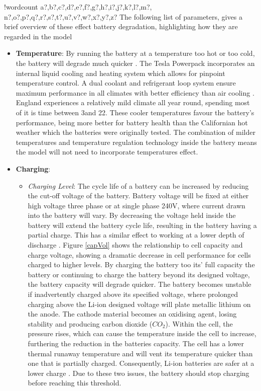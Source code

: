\documentclass[fontsize=9.5pt]{extarticle}
\numberwithin{figure}{section} %
\providecommand{\tightlist}{%
  \setlength{\itemsep}{0pt}\setlength{\parskip}{0pt}}
\newcounter{words}
\newenvironment{counted}{%
  \setcounter{words}{0}
  \SearchList!{wordcount}{\stepcounter{words}}
    {a?,b?,c?,d?,e?,f?,g?,h?,i?,j?,k?,l?,m?,
    n?,o?,p?,q?,r?,s?,t?,u?,v?,w?,x?,y?,z?}
  \UndoBoundary{'}
  \SearchOrder{p;}}{%
  \StopSearching}
\begin{document}
\begin{counted}
The following list of parameters, gives a brief overview of these effect
battery degradation, highlighting how they are regarded in the model

\begin{itemize}
\item
  \textbf{Temperature}: By running the battery at a temperature too hot
  or too cold, the battery will degrade much quicker
  \cite{rong2006analytical}. The Tesla Powerpack incorporates an
  internal liquid cooling and heating system which allows for pinpoint
  temperature control. A dual coolant and refrigerant loop system ensure
  maximum performance in all climates with better efficiency than air
  cooling \cite{Powerpac95:online}. England experiences a relatively
  mild climate all year round, spending most of it is time between
  3\degree and 22\degree \cite{WeatherA0:online}. These cooler
  temperatures favour the battery's performance, being more better for
  battery health than the Californian hot weather which the batteries
  were originally tested. The combination of milder temperatures and
  temperature regulation technology inside the battery means the model
  will not need to incorporate temperatures effect.
\item
  \textbf{Charging}:

  \begin{itemize}
  \tightlist
  \item
    \emph{Charging Level}: The cycle life of a battery can be increased
    by reducing the cut-off voltage of the battery. Battery voltage will
    be fixed at either high voltage three phase or at single phase 240V,
    where current drawn into the battery will vary. By decreasing the
    voltage held inside the battery will extend the battery cycle life,
    resulting in the battery having a partial charge. This has a similar
    effect to working at a lower depth of discharge \cite{Choi2002130}.
    Figure \ref{capVol} shows the relationship to cell capacity and
    charge voltage, showing a dramatic decrease in cell performance for
    cells charged to higher levels. By charging the battery too its'
    full capacity the battery or continuing to charge the battery beyond
    its designed voltage, the battery capacity will degrade quicker. The
    battery becomes unstable if inadvertently charged above its
    specified voltage, where prolonged charging above the Li-ion
    designed voltage will plate metallic lithium on the anode. The
    cathode material becomes an oxidising agent, losing stability and
    producing carbon dioxide (\(CO_2\)). Within the cell, the pressure
    rises, which can cause the temperature inside the cell to increase,
    furthering the reduction in the batteries capacity. The cell has a
    lower thermal runaway temperature and will vent its temperature
    quicker than one that is partially charged. Consequently, Li-ion
    batteries are safer at a lower charge \cite{Charging53:online}. Due
    to these two issues, the battery should stop charging before
    reaching this threshold.


\end{itemize}
\end{itemize}
\end{counted}
\end{document}
